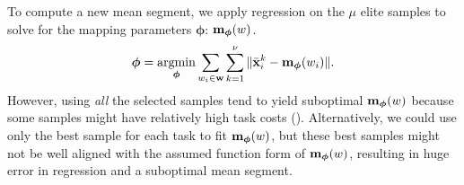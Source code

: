 To compute a new mean segment, we apply regression on the $\mu$ elite
samples to solve for the mapping parameters $\boldsymbol{\phi}$: 
  $\mathbf{m}_{\boldsymbol{\phi}} (w)$. 
\begin{equation}
  \boldsymbol{\phi} = \argmin_{\boldsymbol{\phi}} \sum_{w_i \in \vc{w}} \sum_{k=1}^{\nu}\| \bar{\vc{x}}_i^{k} -
  \vc{m}_{\boldsymbol{\phi}} (w_i) \|.
  \label{eq:optskills_regression}
\end{equation}
However, using \emph{all} the selected samples tend to yield
suboptimal $\mathbf{m}_{\boldsymbol{\phi}}(w)$ because some samples might have
relatively high task costs (). Alternatively, we could use only the
best sample for each task to fit $\mathbf{m}_{\boldsymbol{\phi}}(w)$, but
these best samples might not be well aligned with the assumed
function form of $\mathbf{m}_{\boldsymbol{\phi}}(w)$, resulting in huge error
in regression and a suboptimal mean segment.



  
